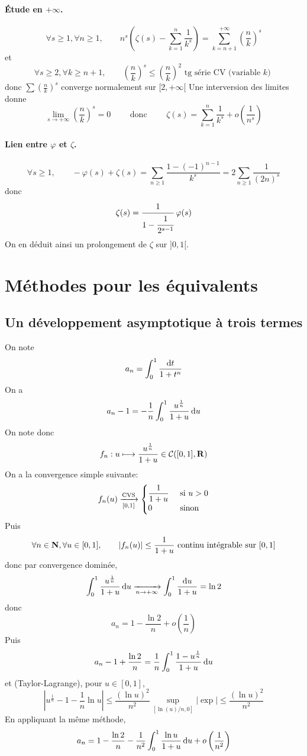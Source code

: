 \paragraph{Étude en \boldmath $+\infty$\unboldmath.} \[
    \forall  s\geq 1, \forall  n\geq 1 , \qquad  n^s\left( \zeta(s)-\sum_{k=1}^n \frac{1}{k^s} \right) =\sum_{k=n+1}^{+\infty} \left( \frac{n}{k} \right) ^s\] 
et \[
    \forall  s\geq 2, \forall  k\geq n+1, \qquad  \left(\frac{n}{k}\right)^s\leq  \left( \frac{n}{k} \right)^2\text{ tg série CV (variable $k$) }
\]
donc $\sum(\frac{n}{k})^s$ converge normalement sur $[2, +\infty[$
Une interversion des limites donne  \[
    \lim _{s\to +\infty} \left( \frac{n}{k} \right) ^s=0 \qquad  \text{ donc } \qquad  \zeta(s)=\sum_{k=1}^n \frac{1}{k^s}+o(\frac{1}{n^s})
\] 

\paragraph{Lien entre \boldmath $\varphi$ et  $\zeta$\unboldmath.}
\[
    \forall  s \geq 1, \qquad  -\varphi(s)+\zeta(s)=\sum_{n\geq 1}\frac{1-(-1)^{n-1}}{k^s}=2\sum_{n\geq 1}\frac{1}{(2n)^s}
\] 
donc \[
    \zeta(s)= \cfrac{1}{1-\cfrac{1}{2^{s-1}}}\;\varphi(s)
\] 
On en déduit ainsi un prolongement de $\zeta$ sur  $]0, 1[$. 

\section{Méthodes pour les équivalents}

\subsection{Un développement asymptotique à trois termes}

On note \[
a_n=\int_0^1 \frac{\mathop{}\!\mathrm d t}{1+t^n}
\] 
On a \[
    a_n-1=-\frac{1}{n} \int_0^1 \frac{u^{\frac{1}{n}}}{1+u}\mathop{}\!\mathrm d u
\] 
On note donc \[
    f_n:u\longmapsto \frac{u^{\frac{1}{n}}}{1+u} \in  \mathcal  C([0, 1], \mathbf R)
\] 
On a la convergence simple suivante: \[
    f_n(u) \xrightarrow[\detokenize{[0, 1]}]{\text{CVS}} \begin{cases}
        \dfrac{1}{1+u} & \text{ si } u>0 \\ 0 & \text{ sinon }
    \end{cases}
\] 
Puis \[
\forall  n \in  \mathbf N, \forall  u \in  [0, 1], \qquad  |f_n(u)|\leq \frac{1}{1+u} \text{ continu intégrable sur } [0, 1]
\] 
donc par convergence dominée, \[
    \int_0^1 \frac{u^{\frac{1}{n}}}{1+u}\mathop{}\!\mathrm d u \xrightarrow[n\to+\infty]{}\int_0^1 \frac{\mathop{}\!\mathrm d u}{1+u}=\ln 2
\] 
donc \[
    a_n=1-\frac{\ln 2}{n}+o \left( \frac{1}{n} \right) 
\] 
Puis \[
    a_n-1+\frac{\ln 2}{n}=\frac{1}{n}\int_0^1 \frac{1-u^{\frac{1}{n}}}{1+u}\mathop{}\!\mathrm d u
\] 
et (Taylor-Lagrange), pour $u \in  [0, 1]$,  \[
    \left| u^{\frac{1}{n}}-1-\frac{1}{n} \ln u \right| \leq  \frac{(\ln u)^2}{n^2} \sup_{[\ln(u)/ n, 0]} |\exp| \leq \frac{(\ln u)^2}{n^2}
\] 
En appliquant la même méthode, \[
    a_n=1- \frac{\ln 2}{n}-\frac{1}{n^2}\int_0^1 \frac{\ln u}{1+u} \mathop{}\!\mathrm d u + o\left( \frac{1}{n^2} \right) 
\] 

